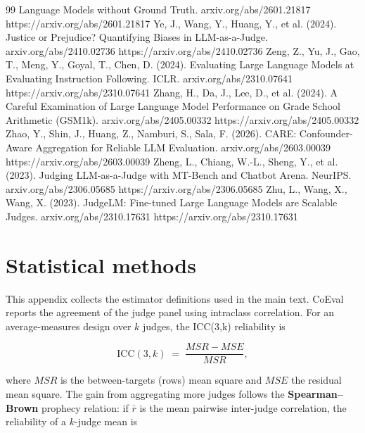 \documentclass[11pt,a4paper]{article}
\begin{document}
\begin{thebibliography}{99}
    Language Models without Ground Truth. arxiv.org/abs/2601.21817 https://arxiv.org/abs/2601.21817
\label{r17} Ye, J., Wang, Y., Huang, Y., et al. (2024). Justice or Prejudice? Quantifying Biases in
    LLM-as-a-Judge. arxiv.org/abs/2410.02736 https://arxiv.org/abs/2410.02736
\label{r38} Zeng, Z., Yu, J., Gao, T., Meng, Y., Goyal, T., Chen, D. (2024). Evaluating Large Language
    Models at Evaluating Instruction Following. ICLR. arxiv.org/abs/2310.07641 https://arxiv.org/abs/2310.07641
\label{r12} Zhang, H., Da, J., Lee, D., et al. (2024). A Careful Examination of Large Language Model Performance on
    Grade School Arithmetic (GSM1k). arxiv.org/abs/2405.00332 https://arxiv.org/abs/2405.00332
\label{r28} Zhao, Y., Shin, J., Huang, Z., Namburi, S., Sala, F. (2026). CARE: Confounder-Aware Aggregation
    for Reliable LLM Evaluation. arxiv.org/abs/2603.00039 https://arxiv.org/abs/2603.00039
\label{r1} Zheng, L., Chiang, W.-L., Sheng, Y., et al. (2023). Judging LLM-as-a-Judge with MT-Bench and Chatbot
    Arena. NeurIPS. arxiv.org/abs/2306.05685 https://arxiv.org/abs/2306.05685
\label{r35} Zhu, L., Wang, X., Wang, X. (2023). JudgeLM: Fine-tuned Large Language Models are Scalable
    Judges. arxiv.org/abs/2310.17631 https://arxiv.org/abs/2310.17631
\end{thebibliography}

\appendix
\section{Statistical methods}\label{appA}

This appendix collects the estimator definitions used in the main text. CoEval reports the agreement of the judge
panel using intraclass correlation. For an average-measures design over \(k\) judges, the ICC(3,k) reliability is

\[\mathrm{ICC}(3,k) \;=\; \frac{MSR - MSE}{MSR},\]

where \(MSR\) is the between-targets (rows) mean square and \(MSE\) the residual mean square. The gain from aggregating
more judges follows the \textbf{Spearman--Brown} prophecy relation: if \(\bar{r}\) is the mean pairwise
inter-judge correlation, the reliability of a \(k\)-judge mean is
\end{document}
